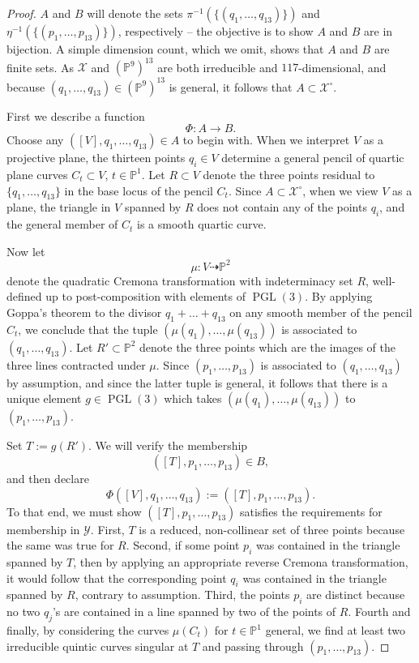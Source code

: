 \documentclass{article}
\renewcommand{\P}{\mathbb{P}}
\DeclareMathOperator{\PGL}{PGL}
\begin{document}
\begin{proof}
    $A$ and $B$ will denote the sets $\pi^{-1}(\{(q_{1}, \dots, q_{13})\})$ and $\eta^{-1}(\{(p_{1}, \dots, p_{13})\})$, respectively -- the objective is to show $A$ and $B$ are in bijection.  A simple dimension count, which we omit, shows that $A$ and $B$ are finite sets.  As $\mathcal{X}$ and $(\P^{9})^{13}$ are both  irreducible and $117$-dimensional, and because $(q_{1}, \dots, q_{13}) \in (\P^{9})^{13}$ is general, it follows that $A \subset \mathcal{X}^{\circ}$. 
    
    First we describe a function $$\Phi: A \to B.$$ Choose any $([V],q_{1}, \dots, q_{13}) \in A$ to begin with. When we interpret $V$ as a projective plane, the thirteen points $q_{i} \in V$ determine a general pencil of quartic plane curves $C_{t} \subset V$, $t \in \P^{1}$. Let $R \subset V$ denote the three points residual to $\{q_{1}, \dots, q_{13}\}$ in the base locus of the pencil $C_{t}$.  Since $A \subset \mathcal{X}^{\circ}$, when we view $V$ as a plane, the triangle in $V$ spanned by $R$ does not contain any of the points $q_{i}$, and the general member of $C_{t}$ is a smooth quartic curve.  

    Now let $$\mu: V \dashrightarrow \P^{2}$$ denote the quadratic Cremona transformation with indeterminacy set $R$, well-defined up to post-composition with elements of $\PGL(3)$. By applying Goppa's theorem to the divisor $q_{1} + \dots + q_{13}$ on any smooth member of the pencil $C_{t}$, we conclude that the tuple $(\mu(q_{1}), \dots, \mu(q_{13}))$ is associated to $(q_{1}, \dots, q_{13}).$  Let $R' \subset \P^{2}$ denote the three points which are the images of the three lines contracted under $\mu$.  Since $(p_{1}, \dots, p_{13})$ is associated to $(q_{1}, \dots, q_{13})$ by assumption, and since the latter tuple is general, it follows that there is a unique element  $g \in \PGL(3)$ which takes $(\mu(q_{1}), \dots, \mu(q_{13}))$ to $(p_{1}, \dots, p_{13})$. 
    
    Set $T := g (R')$. We will verify the membership $$([T],p_{1}, \dots, p_{13}) \in B,$$ and then declare $$\Phi([V],q_{1}, \dots, q_{13}) := ([T],p_{1}, \dots, p_{13}).$$  To that end, we must show $([T],p_{1}, \dots, p_{13})$ satisfies the requirements for membership in  $\mathcal{Y}.$ First, $T$ is a reduced, non-collinear set of three points because the same was true for $R$. Second, if some point  $p_{i}$ was contained in the triangle spanned by $T$, then by applying an appropriate reverse Cremona transformation, it would follow that the corresponding point $q_{i}$ was contained in the triangle spanned by $R$, contrary to assumption. Third, the points $p_{i}$ are distinct because no two $q_{j}$'s are contained in a line spanned by two of the points of $R$. Fourth and finally, by considering the curves $\mu(C_{t})$ for $t \in \P^{1}$ general, we find at least two irreducible quintic curves singular at $T$ and passing through $(p_{1}, \dots, p_{13})$. 


\end{proof}
\end{document}
